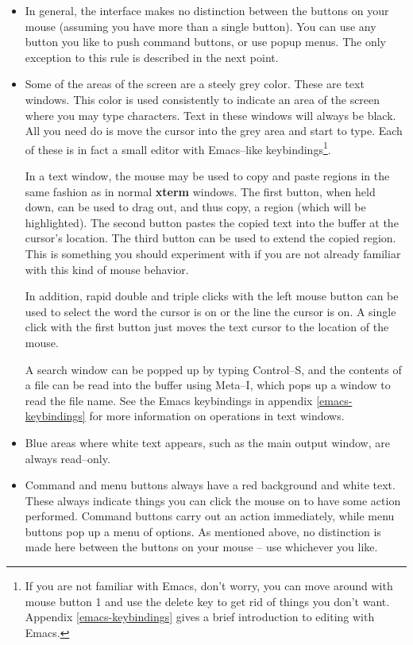\begin{itemize}

\item
{}
In general, the interface makes no distinction between the buttons on
your mouse (assuming you have more than a single button). You can use
any button you like to push command buttons, or use popup menus.
 The only exception to this rule is described
in the next point.

\item
{}
Some of the areas of the screen are a steely grey color. These are
text windows. This color is used consistently to indicate an area of
the screen where you may type characters. Text in these windows will
always be black. All you need do is move the cursor into the grey area
and start to type. Each of these is in fact a small editor with
Emacs--like keybindings\footnote{If you are not familiar with Emacs,
don't worry, you can move around with mouse button 1 and use the
delete key to get rid of things you don't want. Appendix
\ref{emacs-keybindings} gives a brief introduction to editing with
Emacs.}.

In a text window, the mouse may be used to copy and paste regions in
the same fashion as in normal {\bf xterm} windows. The first button, when
held down, can be used to drag out, and thus copy, a region (which
will be highlighted). The second button pastes the copied text into
the buffer at the cursor's location. The third button can be used to
extend the copied region. This is something you should experiment with
if you are not already familiar with this kind of mouse behavior.

In addition, rapid double and triple clicks with the left mouse button
can be used to select the word the cursor is on or the line the cursor
is on. A single click with the first button just moves the text cursor
to the location of the mouse.

A search window can be popped up by typing Control--S, and the
contents of a file can be read into the buffer using Meta--I, which
pops up a window to read the file name. See the Emacs keybindings in
appendix \ref{emacs-keybindings} for more information on operations in
text windows.

\item
{}
Blue areas where white text appears, such as the main output window,
are always read--only.

\item
{}
Command and menu buttons always have a red background and white text.
These always indicate things you can click the mouse on to have some
action performed. Command buttons carry out an action immediately,
while menu buttons pop up a menu of options.  As mentioned above, no
distinction is made here between the buttons on your mouse -- use
whichever you like. 


\end{itemize}
